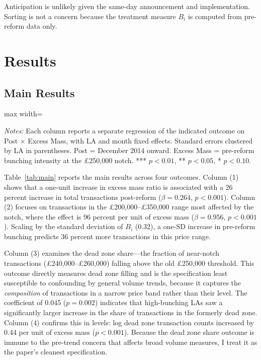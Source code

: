 \documentclass[12pt]{article}
\begin{document}
Anticipation is unlikely given the same-day announcement and implementation. Sorting is not a concern because the treatment measure $B_i$ is computed from pre-reform data only.

\section{Results}
\label{sec:results}

\subsection{Main Results}

\begin{table}[htbp]
\caption{Main Results: Effect of Notch Abolition on Transaction Activity}
\label{tab:main}
\begin{adjustbox}{max width=\textwidth}

\end{adjustbox}
\begin{minipage}{0.95\textwidth}\vspace{0.3em}
\footnotesize\textit{Notes:} Each column reports a separate regression of the indicated outcome on Post $\times$ Excess Mass, with LA and month fixed effects. Standard errors clustered by LA in parentheses. Post = December 2014 onward. Excess Mass = pre-reform bunching intensity at the \pounds250,000 notch. *** $p<0.01$, ** $p<0.05$, * $p<0.10$.
\end{minipage}
\end{table}

Table~\ref{tab:main} reports the main results across four outcomes. Column (1) shows that a one-unit increase in excess mass ratio is associated with a 26 percent increase in total transactions post-reform ($\beta = 0.264$, $p < 0.001$). Column (2) focuses on transactions in the \pounds200,000--\pounds350,000 range most affected by the notch, where the effect is 96 percent per unit of excess mass ($\beta = 0.956$, $p < 0.001$). Scaling by the standard deviation of $B_i$ (0.32), a one-SD increase in pre-reform bunching predicts 36 percent more transactions in this price range.

Column (3) examines the dead zone share---the fraction of near-notch transactions (\pounds240,000--\pounds260,000) falling above the old \pounds250,000 threshold. This outcome directly measures dead zone filling and is the specification least susceptible to confounding by general volume trends, because it captures the \emph{composition} of transactions in a narrow price band rather than their level. The coefficient of 0.045 ($p = 0.002$) indicates that high-bunching LAs saw a significantly larger increase in the share of transactions in the formerly dead zone. Column (4) confirms this in levels: log dead zone transaction counts increased by 0.44 per unit of excess mass ($p < 0.001$). Because the dead zone share outcome is immune to the pre-trend concern that affects broad volume measures, I treat it as the paper's cleanest specification.
\end{document}
